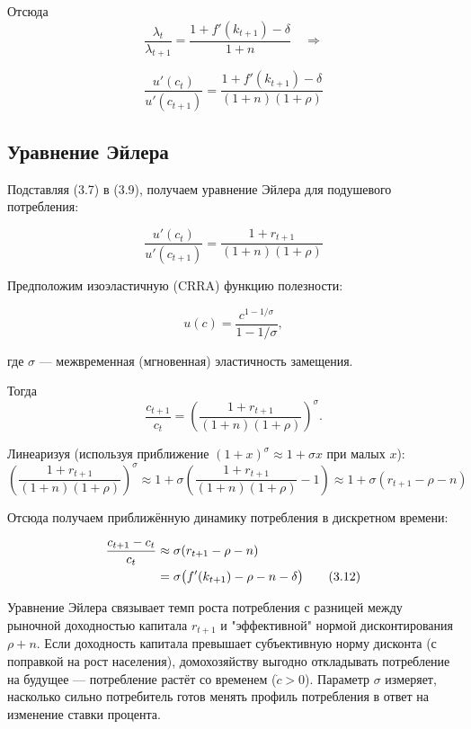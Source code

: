 \documentclass[10pt,a4paper]{article}
\begin{document}
Отсюда
$$\frac{\lambda_t}{\lambda_{t+1}} = \frac{1+f'(k_{t+1}) - \delta}{1+n} \quad \Rightarrow$$

\begin{formulabox}
\begin{equation}
\frac{u'(c_t)}{u'(c_{t+1})} = \frac{1+f'(k_{t+1})-\delta}{(1+n)(1+\rho)} \tag{3.9}
\end{equation}
\end{formulabox}

\subsection{Уравнение Эйлера}

Подставляя (3.7) в (3.9), получаем уравнение Эйлера для подушевого потребления:
\begin{formulabox}
\begin{equation}
\frac{u'(c_t)}{u'(c_{t+1})} = \frac{1+r_{t+1}}{(1+n)(1+\rho)} \tag{3.10}
\end{equation}
\end{formulabox}

Предположим изоэластичную (CRRA) функцию полезности:
\begin{formulabox}
\begin{equation}
u(c) = \frac{c^{1-1/\sigma}}{1-1/\sigma}, \tag{3.11}
\end{equation}
\end{formulabox}
где $\sigma$ — межвременная (мгновенная) эластичность замещения.

Тогда
$$\frac{c_{t+1}}{c_t} = \left(\frac{1+r_{t+1}}{(1+n)(1+\rho)}\right)^\sigma.$$

Линеаризуя (используя приближение $(1+x)^\sigma \approx 1+\sigma x$ при малых $x$):
$$\left(\frac{1+r_{t+1}}{(1+n)(1+\rho)}\right)^\sigma \approx 1 + \sigma\left(\frac{1+r_{t+1}}{(1+n)(1+\rho)} - 1\right) \approx 1 + \sigma(r_{t+1} - \rho - n)$$

Отсюда получаем приближённую динамику потребления в дискретном времени:
\begin{formulabox}
\begin{align}
\frac{c_{t+1}-c_t}{c_t} &\approx \sigma(r_{t+1} - \rho - n) \notag\\
&= \sigma\big(f'(k_{t+1}) - \rho - n - \delta\big) \tag{3.12}
\end{align}
\end{formulabox}

\begin{intuition}
Уравнение Эйлера связывает темп роста потребления с разницей между рыночной доходностью капитала $r_{t+1}$ и "эффективной" нормой дисконтирования $\rho+n$. Если доходность капитала превышает субъективную норму дисконта (с поправкой на рост населения), домохозяйству выгодно откладывать потребление на будущее — потребление растёт со временем ($\dot c>0$). Параметр $\sigma$ измеряет, насколько сильно потребитель готов менять профиль потребления в ответ на изменение ставки процента.
\end{intuition}
\end{document}
